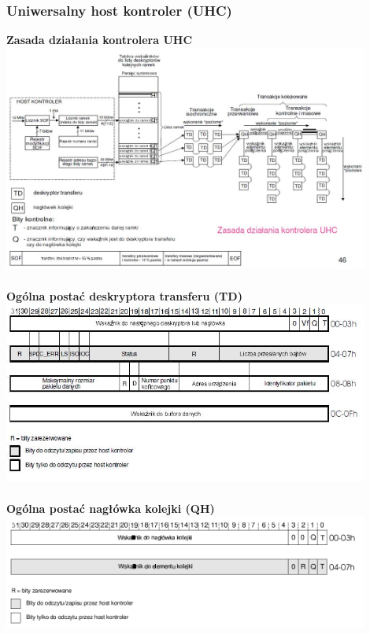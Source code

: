 	\subsubsection{Uniwersalny host kontroler (UHC)}
	\textbf{Zasada działania kontrolera UHC}\\
	\includegraphics[width=12cm]{./wyklady/USB_46_1.jpg}\\\\
	\textbf{Ogólna postać deskryptora transferu (TD)}\\
	\includegraphics[width=12cm]{./wyklady/USB_47_1.jpg}\\\\
	\textbf{Ogólna postać nagłówka kolejki (QH)}\\
	\includegraphics[width=12cm]{./wyklady/USB_48_1.pdf}
